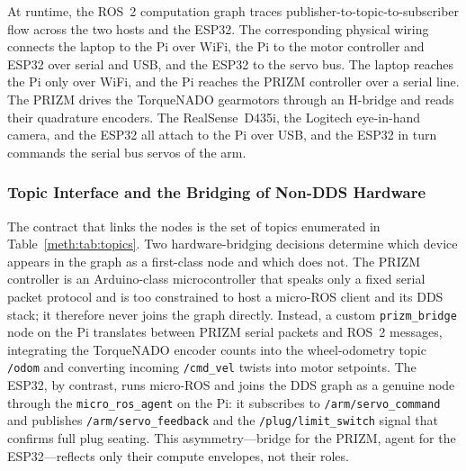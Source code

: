 At runtime, the ROS~2 computation graph traces publisher-to-topic-to-subscriber flow across the two hosts and the ESP32. The corresponding physical wiring connects the laptop to the Pi over WiFi, the Pi to the motor controller and ESP32 over serial and USB, and the ESP32 to the servo bus. The laptop reaches the Pi only over WiFi, and the Pi reaches the PRIZM controller over a serial line. The PRIZM drives the TorqueNADO gearmotors through an H-bridge and reads their quadrature encoders. The RealSense~D435i, the Logitech eye-in-hand camera, and the ESP32 all attach to the Pi over USB, and the ESP32 in turn commands the serial bus servos of the arm.

\subsubsection{Topic Interface and the Bridging of Non-DDS Hardware}

The contract that links the nodes is the set of topics enumerated in Table~\ref{meth:tab:topics}. Two hardware-bridging decisions determine which device appears in the graph as a first-class node and which does not. The PRIZM controller is an Arduino-class microcontroller that speaks only a fixed serial packet protocol and is too constrained to host a micro-ROS client and its DDS stack; it therefore never joins the graph directly. Instead, a custom \texttt{prizm\_bridge} node on the Pi translates between PRIZM serial packets and ROS~2 messages, integrating the TorqueNADO encoder counts into the wheel-odometry topic \texttt{/odom} and converting incoming \texttt{/cmd\_vel} twists into motor setpoints. The ESP32, by contrast, runs micro-ROS and joins the DDS graph as a genuine node through the \texttt{micro\_ros\_agent} on the Pi: it subscribes to \texttt{/arm/servo\_command} and publishes \texttt{/arm/servo\_feedback} and the \texttt{/plug/limit\_switch} signal that confirms full plug seating. This asymmetry---bridge for the PRIZM, agent for the ESP32---reflects only their compute envelopes, not their roles.

